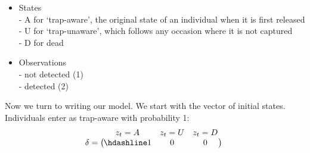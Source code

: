 \documentclass[
  12pt,
]{krantz}
\begin{document}
\begin{itemize}
\item
  States\\
  - A for `trap-aware', the original state of an individual when it is first released\\
  - U for `trap-unaware', which follows any occasion where it is not captured\\
  - D for dead
\item
  Observations\\
  - not detected (1)\\
  - detected (2)
\end{itemize}

Now we turn to writing our model. We start with the vector of initial states. Individuals enter as trap-aware with probability 1:
\[\begin{matrix}
& \\
\mathbf{\delta} =
\left ( \vphantom{ \begin{matrix} 12 \end{matrix} } \right .
\end{matrix}
\hspace{-1.2em}
\begin{matrix}
z_t=A & z_t=U & z_t=D \\ \hdashline
1 & 0 & 0\\
\end{matrix}
\hspace{-0.2em}
\begin{matrix}
& \\
\left . \vphantom{ \begin{matrix} 12 \end{matrix} } \right )
\begin{matrix}
\end{matrix}
\end{matrix}\]
\end{document}
